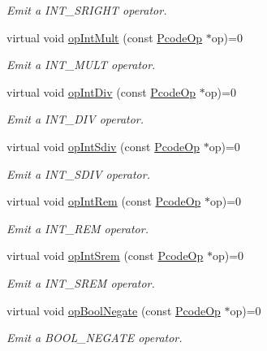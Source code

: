 \begin{DoxyCompactItemize}
\begin{DoxyCompactList}\small\item\em Emit a I\+N\+T\+\_\+\+S\+R\+I\+G\+HT operator. \end{DoxyCompactList}\item 
virtual void \mbox{\hyperlink{class_print_language_a519d0c3b0cc1e091e51e6b59adb452d5}{op\+Int\+Mult}} (const \mbox{\hyperlink{class_pcode_op}{Pcode\+Op}} $\ast$op)=0
\begin{DoxyCompactList}\small\item\em Emit a I\+N\+T\+\_\+\+M\+U\+LT operator. \end{DoxyCompactList}\item 
virtual void \mbox{\hyperlink{class_print_language_afe8a6dd704e76339b37605b3cef60f37}{op\+Int\+Div}} (const \mbox{\hyperlink{class_pcode_op}{Pcode\+Op}} $\ast$op)=0
\begin{DoxyCompactList}\small\item\em Emit a I\+N\+T\+\_\+\+D\+IV operator. \end{DoxyCompactList}\item 
virtual void \mbox{\hyperlink{class_print_language_a9bb29a6a7227951ec3f9c2fa5075ed80}{op\+Int\+Sdiv}} (const \mbox{\hyperlink{class_pcode_op}{Pcode\+Op}} $\ast$op)=0
\begin{DoxyCompactList}\small\item\em Emit a I\+N\+T\+\_\+\+S\+D\+IV operator. \end{DoxyCompactList}\item 
virtual void \mbox{\hyperlink{class_print_language_a80adcf4e190a962a1eb961f35be47056}{op\+Int\+Rem}} (const \mbox{\hyperlink{class_pcode_op}{Pcode\+Op}} $\ast$op)=0
\begin{DoxyCompactList}\small\item\em Emit a I\+N\+T\+\_\+\+R\+EM operator. \end{DoxyCompactList}\item 
virtual void \mbox{\hyperlink{class_print_language_adbf84f28076f2a4c0fbf198c8b3d8ae2}{op\+Int\+Srem}} (const \mbox{\hyperlink{class_pcode_op}{Pcode\+Op}} $\ast$op)=0
\begin{DoxyCompactList}\small\item\em Emit a I\+N\+T\+\_\+\+S\+R\+EM operator. \end{DoxyCompactList}\item 
virtual void \mbox{\hyperlink{class_print_language_a443b37c54859a1932712f9d63534c6c7}{op\+Bool\+Negate}} (const \mbox{\hyperlink{class_pcode_op}{Pcode\+Op}} $\ast$op)=0
\begin{DoxyCompactList}\small\item\em Emit a B\+O\+O\+L\+\_\+\+N\+E\+G\+A\+TE operator. \end{DoxyCompactList}\item 

\end{DoxyCompactItemize}

